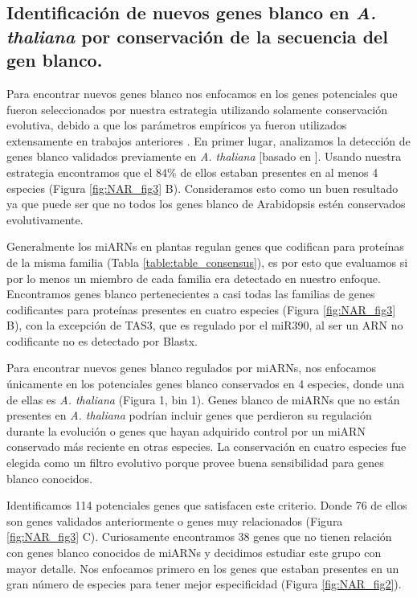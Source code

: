 \subsection{Identificación de nuevos genes blanco en \textit{A. thaliana} por conservación de la secuencia del gen blanco.}


Para encontrar nuevos genes blanco nos enfocamos en los genes potenciales que fueron seleccionados por nuestra estrategia utilizando solamente conservación evolutiva, debido a que los parámetros empíricos ya fueron utilizados extensamente en trabajos anteriores \citep{Allen2005207,JonesRhoades2004787,Schwab2005517}.
En primer lugar, analizamos la detección de genes blanco validados previamente en \textit{A. thaliana} [basado en \citep{Fahlgren2010}].
Usando nuestra estrategia encontramos que el 84\% de ellos estaban presentes en al menos 4 especies (Figura \ref{fig:NAR_fig3} B).
Consideramos esto como un buen resultado ya que puede ser que no todos los genes blanco de Arabidopsis estén conservados evolutivamente.

Generalmente los miARNs en plantas regulan genes que codifican para proteínas de la misma familia (Tabla \ref{table:table_consensus}), es por esto que evaluamos si por lo menos un miembro de cada familia era detectado en nuestro enfoque.
Encontramos genes blanco pertenecientes a casi todas las familias de genes codificantes para proteínas presentes en cuatro especies (Figura \ref{fig:NAR_fig3} B), con la excepción de TAS3, que es regulado por el miR390, al ser un ARN no codificante no es detectado por Blastx. 

Para encontrar nuevos genes blanco regulados por miARNs, nos enfocamos únicamente  en los potenciales genes blanco conservados en 4 especies, donde una de ellas es \textit{A. thaliana} (Figura 1, bin 1). 
Genes blanco de miARNs que no están presentes en \textit{A. thaliana} podrían incluir genes que perdieron su regulación durante la evolución o genes que hayan adquirido control por un miARN conservado más reciente en otras especies.
La conservación en cuatro especies fue elegida como un filtro evolutivo porque provee buena sensibilidad para genes blanco conocidos.

Identificamos 114 potenciales genes que satisfacen este criterio. Donde 76 de ellos son genes validados anteriormente o genes muy relacionados (Figura \ref{fig:NAR_fig3} C).
Curiosamente encontramos 38 genes que no tienen relación con genes blanco conocidos de miARNs y decidimos estudiar este grupo con mayor detalle.
Nos enfocamos primero en los genes que estaban presentes en un gran número de especies para tener mejor especificidad (Figura \ref{fig:NAR_fig2}).

